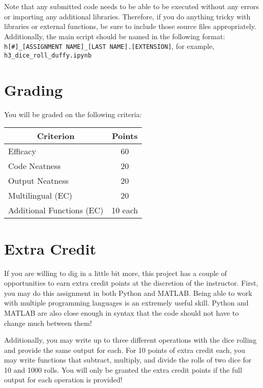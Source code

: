 \documentclass[
	letterpaper, %
	fontsize=10pt, %
	twoside=true, %
	numbers=noenddot, %
]{kaobook}
\begin{document}

Note that any submitted code needs to be able to be executed without any errors or importing any additional libraries.
Therefore, if you do anything tricky with libraries or external functions, be sure to include those source files appropriately.
Additionally, the main script should be named in the following format: \lstinline{h[#]_[ASSIGNMENT NAME]_[LAST NAME].[EXTENSION]}, for example, \lstinline{h3_dice_roll_duffy.ipynb}

\section*{Grading}
You will be graded on the following criteria:

\begin{margintable}
    \begin{tabular}{l | c}
        \toprule
        \multicolumn{1}{c|}{\textbf{Criterion}} & \textbf{Points} \\
        \midrule
        Efficacy & 60 \\
        Code Neatness & 20 \\
        Output Neatness & 20 \\
        Multilingual (EC) & 20 \\
        Additional Functions (EC) & 10 each \\
        \bottomrule
    \end{tabular}
\end{margintable}


\section*{Extra Credit}
If you are willing to dig in a little bit more, this project has a couple of opportunities to earn extra credit points at the discretion of the instructor.
First, you may do this assignment in both Python and MATLAB. 
Being able to work with multiple programming languages is an extremely useful skill.
Python and MATLAB are also close enough in syntax that the code should not have to change much between them!

Additionally, you may write up to three different operations with the dice rolling and provide the same output for each.
For 10 points of extra credit each, you may write functions that subtract, multiply, and divide the rolls of two dice for 10 and 1000 rolls.
You will only be granted the extra credit points if the full output for each operation is provided!
\end{document}
